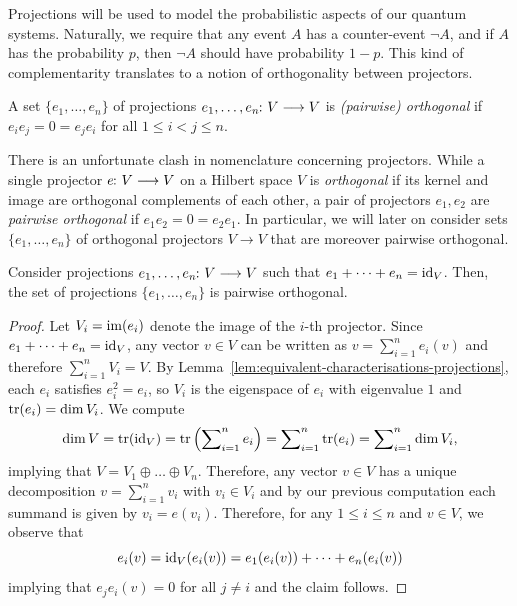 \documentclass[a4paper, oneside, 12pt]{amsart}
\begin{document}
Projections will be used to model the probabilistic aspects of our quantum systems.
Naturally, we require that any event \(A\) has  a counter-event \(\neg A\), and if \(A\) has the probability \(p\), then \(\neg A\) should have probability  \(1-p\).
This kind of complementarity translates to a notion of orthogonality between projectors.

\begin{definition}\label{def:orthogonal-idempotent}
  A set \(\{e_{1}, \dots , e_{n}\}\) of projections \(e_{1}, \dots , e_{n} \from V\to V\) is \emph{(pairwise) orthogonal} if \(e_{i}e_{j} = 0 =  e_{j}e_{i}\) for all \(1\leq i< j \leq n\).
\end{definition}

There is an unfortunate clash in nomenclature concerning projectors.
While a single projector \(e \from V\to V\) on a Hilbert space \(V\) is \emph{orthogonal} if its kernel and image are orthogonal complements of each other,
a pair of projectors \(e_{1}, e_{2}\) are \emph{pairwise orthogonal} if \(e_{1}e_{2} = 0 = e_{2}e_{1}\).
In particular, we will later on consider sets \(\{e_{1}, \dots , e_{n}\}\) of orthogonal projectors \(V\to V\) that are moreover pairwise orthogonal.

\begin{lemma}\label{lem:part-of-1-means-orth}
  Consider projections \( e_1, \dots, e_n \from V \to V \) such that \( e_1 + \dots + e_n = \mathrm{id}_V \).
  Then, the set of projections \( \{ e_1, \dots, e_n \} \) is pairwise orthogonal.
\end{lemma}

\begin{proof}
  Let \( V_i = \operatorname{im}(e_i) \) denote the image of the \( i \)-th projector.
  Since \( e_1 + \dots + e_n = \mathrm{id}_V \), any vector \( v \in V \) can be written as \( v = \sum_{i=1}^n e_i(v) \) and therefore \(\sum_{i=1}^{n} V_{i} = V\).
  By Lemma~\ref{lem:equivalent-characterisations-projections}, each \( e_i \) satisfies \( e_i^2 = e_i \), so \( V_i \) is the eigenspace of \( e_i \) with eigenvalue \(1\) and \( \operatorname{tr}(e_i) = \dim V_i \).
  We compute
  \begin{equation*}
    \dim V = \operatorname{tr}(\mathrm{id}_V)
    = \operatorname{tr}\left(\sum\nolimits_{i=1}^n e_i\right)
    = \sum\nolimits_{i=1}^n \operatorname{tr}(e_i)
    = \sum\nolimits_{i=1}^n \dim V_i,
  \end{equation*}
  implying that \( V = V_1 \oplus \dots \oplus V_n \).
  Therefore, any vector \(v\in V\) has a unique decomposition \(v= \sum_{i=1}^{n} v_{i}\) with \(v_{i}\in V_{i}\) and by our previous computation each summand is given by \(v_{i} = e(v_{i})\).
  Therefore, for any \(1\leq i \leq n\) and \(v\in V\), we observe that
  \begin{equation*}
    e_{i}(v) = \mathrm{id}_{V}(e_{i}(v)) = e_{1}(e_{i}(v)) + \dots + e_{n}(e_{i}(v))
  \end{equation*}
  implying that \(e_{j} e_{i}(v) = 0 \) for all \(j \neq i\) and the claim follows.
\end{proof}
\end{document}
